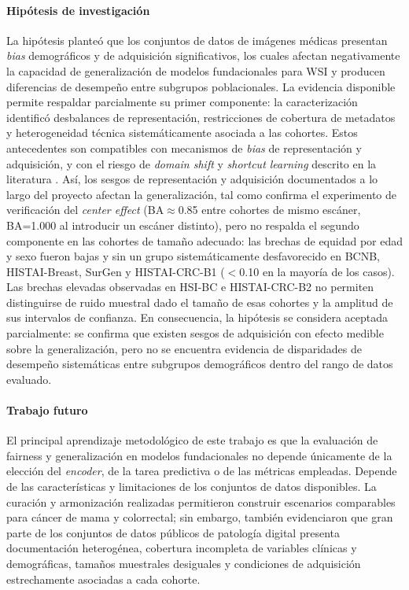 \paragraph{Hipótesis de investigación} La hipótesis planteó que los conjuntos de datos de imágenes médicas presentan \textit{bias} demográficos y de adquisición significativos, los cuales afectan negativamente la capacidad de generalización de modelos fundacionales para WSI y producen diferencias de desempeño entre subgrupos poblacionales. La evidencia disponible permite respaldar parcialmente su primer componente: la caracterización identificó desbalances de representación, restricciones de cobertura de metadatos y heterogeneidad técnica sistemáticamente asociada a las cohortes. Estos antecedentes son compatibles con mecanismos de \textit{bias} de representación y adquisición, y con el riesgo de \textit{domain shift} y \textit{shortcut learning} descrito en la literatura \parencite{suresh2021framework,mehrabi2021survey,geirhos2020shortcut,stacke2021domainshift}. Así, los sesgos de representación y adquisición documentados a lo largo del proyecto afectan la generalización, tal como confirma el experimento de verificación del \textit{center effect} (BA$\approx$0.85 entre cohortes de mismo escáner, BA=1.000 al introducir un escáner distinto), pero no respalda el segundo componente en las cohortes de tamaño adecuado: las brechas de equidad por edad y sexo fueron bajas y sin un grupo sistemáticamente desfavorecido en BCNB, HISTAI-Breast, SurGen y HISTAI-CRC-B1 ($<$0.10 en la mayoría de los casos). Las brechas elevadas observadas en HSI-BC e HISTAI-CRC-B2 no permiten distinguirse de ruido muestral dado el tamaño de esas cohortes y la amplitud de sus intervalos de confianza. En consecuencia, la hipótesis se considera aceptada parcialmente: se confirma que existen sesgos de adquisición con efecto medible sobre la generalización, pero no se encuentra evidencia de disparidades de desempeño sistemáticas entre subgrupos demográficos dentro del rango de datos evaluado.

\paragraph{Trabajo futuro}

El principal aprendizaje metodológico de este trabajo es que la evaluación de fairness y generalización en modelos fundacionales no depende únicamente de la elección del \textit{encoder}, de la tarea predictiva o de las métricas empleadas. Depende de las características y limitaciones de los conjuntos de datos disponibles. La curación y armonización realizadas permitieron construir escenarios comparables para cáncer de mama y colorrectal; sin embargo, también evidenciaron que gran parte de los conjuntos de datos públicos de patología digital presenta documentación heterogénea, cobertura incompleta de variables clínicas y demográficas, tamaños muestrales desiguales y condiciones de adquisición estrechamente asociadas a cada cohorte.

